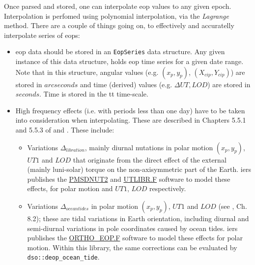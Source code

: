 Once parsed and stored, one can interpolate \gls{eop} values to any given epoch. 
Interpolation is perfomed using polynomial interpolation, via the \emph{Lagrange} method. 
There are a couple of things going on, to effectively and accuratelly interpolate 
series of \glspl{eop}:
\begin{itemize}
  \item \gls{eop} data should be stored in an \texttt{EopSeries} 
    data structure. Any given instance of this data structure, holds \gls{eop} 
    time series for a given date range. Note that in this structure, angular values 
    (e.g. $(x_p, y_p)$, $(X_{cip}, Y_{cip})$) are stored in $arcseconds$ and 
    time (derived) values (e.g. $\Delta UT, LOD$) are stored in $seconds$. Time is 
    stored in the \gls{tt} time-scale.

  \item High frequency effects (i.e. with periods less than one day) have to be 
    taken into consideration when interpolating. These are described in Chapters 
    5.5.1 and 5.5.3 of \cite{iers2010} and \cite{Bradley2016}. These include:
    
    \begin{itemize}
      \item Variations $\Delta _{libration}$, mainly diurnal nutations in 
        polar motion $(x_p, y_p)$, $UT1$ and $LOD$ that originate from the direct 
        effect of the external (mainly luni-solar) torque on the non-axisymmetric 
        part of the Earth. \gls{iers} publishes the 
        \href{https://iers-conventions.obspm.fr/content/chapter5/software/PMSDNUT2.F}{PMSDNUT2} 
        and \href{https://iers-conventions.obspm.fr/content/chapter5/software/UTLIBR.F}{UTLIBR.F} 
        software to model these effects, for polar motion and $UT1$, $LOD$ respectively. 

      \item Variations $\Delta _{ocean tides}$ in polar motion $(x_p, y_p)$, $UT1$ and $LOD$ (see \cite{iers2010}, Ch. 8.2); 
        these are tidal variations in Earth orientation, including diurnal and semi-diurnal 
        variations in pole coordinates caused by ocean tides. \gls{iers} publishes the 
        \href{https://iers-conventions.obspm.fr/content/chapter8/software/ORTHO_EOP.F}{ORTHO\_EOP.F} 
        software to model these effects for polar motion. Within this library, the same 
        corrections can be evaluated by \texttt{dso::deop_ocean_tide}.
        

\end{itemize}
\end{itemize}
